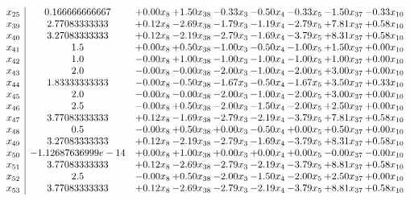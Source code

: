 \documentclass[8pt]{article}
\begin{document}
\[\begin{array}{c| c c@{\hskip 2pt} c@{\hskip 2pt} c@{\hskip 2pt} c@{\hskip 2pt} c@{\hskip 2pt} c@{\hskip 2pt} c@{\hskip 2pt} }
 x_{25}   &  0.166666666667 & +  0.00 x_{8} & +  1.50 x_{38} & -0.33 x_{3} & -0.50 x_{4} & -0.33 x_{5} & -1.50 x_{37} & -0.33 x_{10}\\
 x_{39}   &  2.77083333333 & +  0.12 x_{8} & -2.69 x_{38} & -1.79 x_{3} & -1.19 x_{4} & -2.79 x_{5} & +  7.81 x_{37} & +  0.58 x_{10}\\
 x_{40}   &  3.27083333333 & +  0.12 x_{8} & -2.19 x_{38} & -2.79 x_{3} & -1.69 x_{4} & -3.79 x_{5} & +  8.31 x_{37} & +  0.58 x_{10}\\
 x_{41}   &  1.5 & +  0.00 x_{8} & +  0.50 x_{38} & -1.00 x_{3} & -0.50 x_{4} & -1.00 x_{5} & +  1.50 x_{37} & +  0.00 x_{10}\\
 x_{42}   &  1.0 & -0.00 x_{8} & +  1.00 x_{38} & -1.00 x_{3} & -1.00 x_{4} & -1.00 x_{5} & +  1.00 x_{37} & +  0.00 x_{10}\\
 x_{43}   &  2.0 & -0.00 x_{8} & -0.00 x_{38} & -2.00 x_{3} & -1.00 x_{4} & -2.00 x_{5} & +  3.00 x_{37} & +  0.00 x_{10}\\
 x_{44}   &  1.83333333333 & -0.00 x_{8} & -0.50 x_{38} & -1.67 x_{3} & -0.50 x_{4} & -1.67 x_{5} & +  3.50 x_{37} & +  0.33 x_{10}\\
 x_{45}   &  2.0 & -0.00 x_{8} & -0.00 x_{38} & -2.00 x_{3} & -1.00 x_{4} & -2.00 x_{5} & +  3.00 x_{37} & +  0.00 x_{10}\\
 x_{46}   &  2.5 & -0.00 x_{8} & +  0.50 x_{38} & -2.00 x_{3} & -1.50 x_{4} & -2.00 x_{5} & +  2.50 x_{37} & +  0.00 x_{10}\\
 x_{47}   &  3.77083333333 & +  0.12 x_{8} & -1.69 x_{38} & -2.79 x_{3} & -2.19 x_{4} & -3.79 x_{5} & +  7.81 x_{37} & +  0.58 x_{10}\\
 x_{48}   &  0.5 & -0.00 x_{8} & +  0.50 x_{38} & +  0.00 x_{3} & -0.50 x_{4} & +  0.00 x_{5} & +  0.50 x_{37} & +  0.00 x_{10}\\
 x_{49}   &  3.27083333333 & +  0.12 x_{8} & -2.19 x_{38} & -2.79 x_{3} & -1.69 x_{4} & -3.79 x_{5} & +  8.31 x_{37} & +  0.58 x_{10}\\
 x_{50}   &  -1.12687636999e-14 & +  0.00 x_{8} & +  1.00 x_{38} & +  0.00 x_{3} & +  0.00 x_{4} & +  0.00 x_{5} & -0.00 x_{37} & -0.00 x_{10}\\
 x_{51}   &  3.77083333333 & +  0.12 x_{8} & -2.69 x_{38} & -2.79 x_{3} & -2.19 x_{4} & -3.79 x_{5} & +  8.81 x_{37} & +  0.58 x_{10}\\
 x_{52}   &  2.5 & -0.00 x_{8} & +  0.50 x_{38} & -2.00 x_{3} & -1.50 x_{4} & -2.00 x_{5} & +  2.50 x_{37} & +  0.00 x_{10}\\
 x_{53}   &  3.77083333333 & +  0.12 x_{8} & -2.69 x_{38} & -2.79 x_{3} & -2.19 x_{4} & -3.79 x_{5} & +  8.81 x_{37} & +  0.58 x_{10}\\

\end{array}\]
\end{document}
